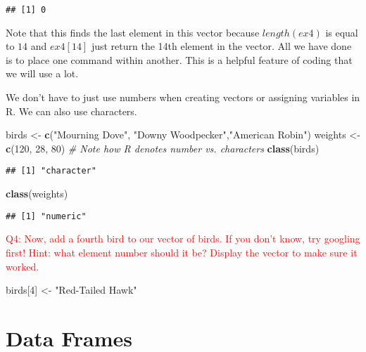 \documentclass[]{article}
\newenvironment{Shaded}{\begin{snugshade}}{\end{snugshade}}
\newcommand{\CommentTok}[1]{\textcolor[rgb]{0.56,0.35,0.01}{\textit{#1}}}
\newcommand{\DecValTok}[1]{\textcolor[rgb]{0.00,0.00,0.81}{#1}}
\newcommand{\KeywordTok}[1]{\textcolor[rgb]{0.13,0.29,0.53}{\textbf{#1}}}
\newcommand{\NormalTok}[1]{#1}
\newcommand{\StringTok}[1]{\textcolor[rgb]{0.31,0.60,0.02}{#1}}
\begin{document}
\begin{verbatim}
## [1] 0
\end{verbatim}

Note that this finds the last element in this vector because
\(length(ex4)\) is equal to \(14\) and \(ex4[14]\) just return the 14th
element in the vector. All we have done is to place one command within
another. This is a helpful feature of coding that we will use a lot.

We don't have to just use numbers when creating vectors or assigning
variables in R. We can also use characters.

\begin{Shaded}
\begin{Highlighting}[]
\NormalTok{birds <-}\StringTok{ }\KeywordTok{c}\NormalTok{(}\StringTok{"Mourning Dove"}\NormalTok{, }\StringTok{"Downy Woodpecker"}\NormalTok{,}\StringTok{"American Robin"}\NormalTok{)}
\NormalTok{weights <-}\StringTok{ }\KeywordTok{c}\NormalTok{(}\DecValTok{120}\NormalTok{, }\DecValTok{28}\NormalTok{, }\DecValTok{80}\NormalTok{)}
\CommentTok{# Note how R denotes number vs. characters}
\KeywordTok{class}\NormalTok{(birds)}
\end{Highlighting}
\end{Shaded}

\begin{verbatim}
## [1] "character"
\end{verbatim}

\begin{Shaded}
\begin{Highlighting}[]
\KeywordTok{class}\NormalTok{(weights)}
\end{Highlighting}
\end{Shaded}

\begin{verbatim}
## [1] "numeric"
\end{verbatim}

\textcolor{red}{Q4: Now, add a fourth bird to our vector of birds. If you don't know, try googling first! Hint: what element number should it be? Display the vector to make sure it worked.}

\begin{Shaded}
\begin{Highlighting}[]
\NormalTok{birds[}\DecValTok{4}\NormalTok{] <-}\StringTok{ "Red-Tailed Hawk"}
\end{Highlighting}
\end{Shaded}

\hypertarget{data-frames}{%
\section{Data Frames}\label{data-frames}}
\end{document}
